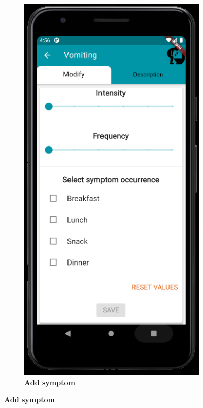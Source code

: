\documentclass [12pt]{article}
\begin{document}
\begin{description}[leftmargin=1cm,rightmargin=1cm]
\begin{figure}[h!]
\begin{subfigure}[tr]{0.3\linewidth}
\includegraphics[width=\linewidth]{addSymptom2.PNG}
\caption{\textbf{Add symptom}}
\end{subfigure}

\end{figure}
\end{description}
\end{document}
